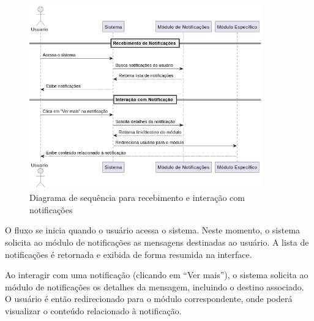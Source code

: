 \begin{figure}[H]
    \centering
    \includegraphics[width=0.9\textwidth]{images/diagramasdesequencias/notification.png}
    \caption{Diagrama de sequência para recebimento e interação com notificações}
    \label{fig:notificationFlow}
\end{figure}

O fluxo se inicia quando o usuário acessa o sistema. Neste momento, o sistema solicita ao módulo de notificações as mensagens destinadas ao usuário. A lista de notificações é retornada e exibida de forma resumida na interface.

Ao interagir com uma notificação (clicando em “Ver mais”), o sistema solicita ao módulo de notificações os detalhes da mensagem, incluindo o destino associado. O usuário é então redirecionado para o módulo correspondente, onde poderá visualizar o conteúdo relacionado à notificação.
